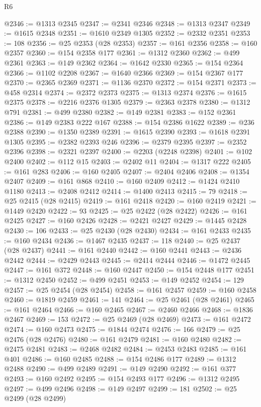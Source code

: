 \begin{lexlean}{R6}
\begin{coremodule}
@2346 := @1313 @2345
@2347 := @2341 @2346
@2348 := @1313 @2347
@2349 := @1615 @2348
@2351 := @1610 @2349 @1305
@2352 := @2332 @2351
@2353 := 108
@2356 := @25 @2353 (@28 @2353)
@2357 := @161 @2356
@2358 := @160 @2357
@2360 := @154 @2358 @177
@2361 := @1312 @2360
@2362 := @499 @2361
@2363 := @149 @2362
@2364 := @1642 @2330
@2365 := @154 @2364
@2366 := @1102 @2208
@2367 := @1640 @2366
@2369 := @154 @2367 @177
@2370 := @2365 @2369
@2371 := @1136 @2370
@2372 := @154 @2371
@2373 := @458 @2314
@2374 := @2372 @2373
@2375 := @1313 @2374
@2376 := @1615 @2375
@2378 := @2216 @2376 @1305
@2379 := @2363 @2378
@2380 := @1312 @791
@2381 := @499 @2380
@2382 := @149 @2381
@2383 := @152 @2361
@2386 := @149 @2383 @222 @167
@2388 := @154 @2386 @1622
@2389 := @236 @2388
@2390 := @1350 @2389
@2391 := @1615 @2390
@2393 := @1618 @2391 @1305
@2395 := @2382 @2393 @246
@2396 := @2379 @2395
@2397 := @2352 @2396
@2398 := @2321 @2397
@2400 := @2203 (@2248 @2398)
@2401 := @102 @2400
@2402 := @112 @15
@2403 := @2402 @11
@2404 := @1317 @222
@2405 := @161 @283
@2406 := @160 @2405
@2407 := @2404 @2406
@2408 := @1354 @2407
@2409 := @161 @868
@2410 := @160 @2409
@2412 := @1424 @2410 @1180
@2413 := @2408 @2412
@2414 := @1400 @2413
@2415 := 79
@2418 := @25 @2415 (@28 @2415)
@2419 := @161 @2418
@2420 := @160 @2419
@2421 := @1449 @2420
@2422 := 93
@2425 := @25 @2422 (@28 @2422)
@2426 := @161 @2425
@2427 := @160 @2426
@2428 := @2421 @2427
@2429 := @1445 @2428
@2430 := 106
@2433 := @25 @2430 (@28 @2430)
@2434 := @161 @2433
@2435 := @160 @2434
@2436 := @1467 @2435
@2437 := 118
@2440 := @25 @2437 (@28 @2437)
@2441 := @161 @2440
@2442 := @160 @2441
@2443 := @2436 @2442
@2444 := @2429 @2443
@2445 := @2414 @2444
@2446 := @1472 @2445
@2447 := @161 @372
@2448 := @160 @2447
@2450 := @154 @2448 @177
@2451 := @1312 @2450
@2452 := @499 @2451
@2453 := @149 @2452
@2454 := 129
@2457 := @25 @2454 (@28 @2454)
@2458 := @161 @2457
@2459 := @160 @2458
@2460 := @1819 @2459
@2461 := 141
@2464 := @25 @2461 (@28 @2461)
@2465 := @161 @2464
@2466 := @160 @2465
@2467 := @2460 @2466
@2468 := @1836 @2467
@2469 := 153
@2472 := @25 @2469 (@28 @2469)
@2473 := @161 @2472
@2474 := @160 @2473
@2475 := @1844 @2474
@2476 := 166
@2479 := @25 @2476 (@28 @2476)
@2480 := @161 @2479
@2481 := @160 @2480
@2482 := @2475 @2481
@2483 := @2468 @2482
@2484 := @2453 @2483
@2485 := @161 @401
@2486 := @160 @2485
@2488 := @154 @2486 @177
@2489 := @1312 @2488
@2490 := @499 @2489
@2491 := @149 @2490
@2492 := @161 @377
@2493 := @160 @2492
@2495 := @154 @2493 @177
@2496 := @1312 @2495
@2497 := @499 @2496
@2498 := @149 @2497
@2499 := 181
@2502 := @25 @2499 (@28 @2499)

\end{coremodule}
\end{lexlean}
